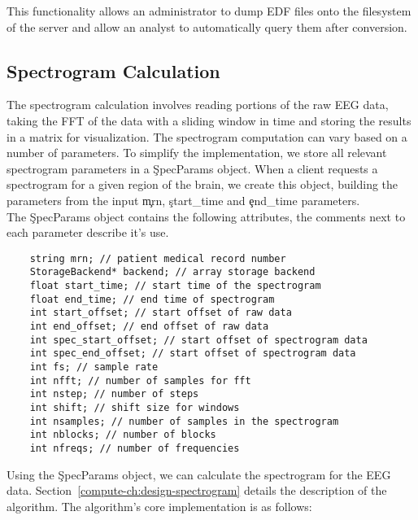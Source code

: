 This functionality allows an administrator to dump EDF files onto the
filesystem of the server and allow an analyst to automatically query them after
conversion.

\subsection{Spectrogram Calculation}\label{compute-ch:implementation-spectrogram}

The spectrogram calculation involves reading portions of the raw EEG data,
taking the FFT of the data with a sliding window in time and storing the
results in a matrix for visualization. The spectrogram computation can vary
based on a number of parameters. To simplify the implementation, we store all
relevant spectrogram parameters in a \c{SpecParams} object. When a client
requests a spectrogram for a given region of the brain, we create this object,
building the parameters from the input \c{mrn}, \c{start\_time} and
\c{end\_time} parameters. \\

The \c{SpecParams} object contains the following attributes, the comments next
to each parameter describe it's use.

\begin{lstlisting}
    string mrn; // patient medical record number
    StorageBackend* backend; // array storage backend
    float start_time; // start time of the spectrogram
    float end_time; // end time of spectrogram
    int start_offset; // start offset of raw data
    int end_offset; // end offset of raw data
    int spec_start_offset; // start offset of spectrogram data
    int spec_end_offset; // start offset of spectrogram data
    int fs; // sample rate
    int nfft; // number of samples for fft
    int nstep; // number of steps
    int shift; // shift size for windows
    int nsamples; // number of samples in the spectrogram
    int nblocks; // number of blocks
    int nfreqs; // number of frequencies
\end{lstlisting}

Using the \c{SpecParams} object, we can calculate the spectrogram for the EEG
data. Section~\ref{compute-ch:design-spectrogram} details the description of
the algorithm. The algorithm's core implementation is as follows:

